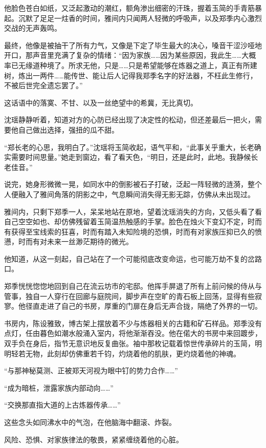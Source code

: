 他脸色苍白如纸，又泛起激动的潮红，额角渗出细密的汗珠，握着玉简的手青筋暴起。沉默了足足一炷香的时间，雅间内只闻两人轻微的呼吸声，以及郑季内心激烈交战的无声轰鸣。

最终，他像是被抽干了所有力气，又像是下定了毕生最大的决心，嗓音干涩沙哑地开口，那声音里充满了复杂的情绪：“因为家族……因为某些原因，我此生……大概率已无缘道种境了。所求无他，只是……只是希望能够在炼器之道上，真正有所建树，炼出一两件……能传世、能让后人记得我郑季名字的好法器，不枉此生修行，不被后世完全遗忘罢了。”

这话语中的落寞、不甘、以及一丝绝望中的希冀，无比真切。

沈瑶静静听着，知道对方的心防已经出现了决定性的松动，但还差最后一把火，需要他自己做出选择，强扭的瓜不甜。

“郑长老的心思，我明白了。”沈瑶将玉简收起，语气平和，“此事关乎重大，长老确实需要时间思量。”她走到窗边，看了看天色，“明日，还是此时，此地。我静候长老佳音。”

说完，她身形微微一晃，如同水中的倒影被石子打破，泛起一阵轻微的涟漪，整个人便融入了雅间角落的阴影之中，气息瞬间消失得无影无踪，仿佛从未出现过。

雅间内，只剩下郑季一人，呆呆地站在原地，望着沈瑶消失的方向，又低头看了看自己空空如也、却仿佛残留着玉简温热触感的手掌。脸色在烛火下变幻不定，时而有获得至宝线索的狂喜，时而有踏入未知险境的恐惧，时而有对家族压抑已久的愤懑，时而有对未来一丝渺茫期待的微光。

他知道，从这一刻起，自己站在了一个可能彻底改变命运，也可能万劫不复的岔路口。

\vspace{2em}

郑季恍恍惚惚地回到自己在流云坊市的宅邸。他挥手屏退了所有上前问候的侍从与管事，独自一人穿行在回廊与庭院间，脚步声在空旷的青石板上回荡，显得有些寂寥。他径直走进了自己的书房，厚重的门扉在身后无声合拢，隔绝了外界的一切。

书房内，陈设雅致，博古架上摆放着不少与炼器相关的古籍和矿石样品。郑季没有点灯，任由暮色如潮水般涌入室内，将他渐渐吞没。他在偌大的书房中来回踱步，双手负在身后，指节无意识地反复曲张。袖中那枚记载着惊世传承碎片的玉简，明明轻若无物，此刻却仿佛重若千钧，灼烧着他的肌肤，更灼烧着他的神魂。

“与那神秘莫测、正被郑天河视为眼中钉的势力合作……”

“成为暗桩，泄露家族内部动向……”

“交换那直指大道的上古炼器传承……”

这些念头如同沸水中的气泡，在他脑海中翻滚、炸裂。

风险、恐惧、对家族律法的敬畏，紧紧缠绕着他的心脏。

